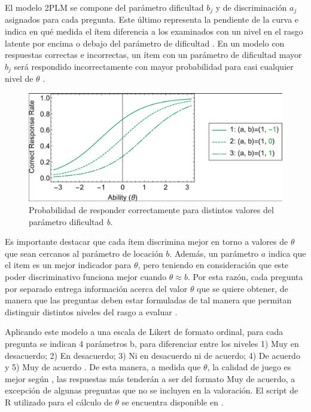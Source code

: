 El modelo 2PLM se compone del parámetro dificultad $b_j$ y de discriminación $a_j$ asignados para cada pregunta. Este último representa la pendiente de la curva e indica en qué medida el ítem diferencia a los examinados con un nivel en el rasgo latente por encima o debajo del parámetro de dificultad \cite{TeoriaRespuestaAlItemPsicologia}. En un modelo con respuestas correctas e incorrectas, un ítem con un parámetro de dificultad mayor $b_j$ será respondido incorrectamente con mayor probabilidad para casi cualquier nivel de $\theta$ \cite{IRTShojima2022}.


\begin{figure}[h]
	\centering
	\includegraphics[scale=.5]{imagenes/IRTparambdifficulty.png}
	\caption{Probabilidad de responder correctamente para distintos valores del parámetro dificultad \textit{b}.}
	\label{ParamDifficulty}
\end{figure}


Es importante destacar que cada ítem discrimina mejor en torno a valores de $\theta$ que sean cercanos al parámetro de locación $b$. Además, un parámetro $a$ indica que el item es un mejor indicador para $\theta$, pero teniendo en consideración que este poder discriminativo funciona mejor cuando $\theta \approx b$. Por esta razón, cada pregunta por separado entrega información acerca del valor $\theta$ que se quiere obtener, de manera que las preguntas deben estar formuladas de tal manera que permitan distinguir distintos niveles del rasgo a evaluar \cite{TeoriaRespuestaAlItemPsicologia}.

Aplicando este modelo a una escala de Likert de formato ordinal, para cada pregunta se indican 4 parámetros b, para diferenciar entre los niveles 1) Muy en desacuerdo; 2) En desacuerdo; 3) Ni en desacuerdo ni de acuerdo; 4) De acuerdo y 5) Muy de acuerdo \cite{TeoriaRespuestaAlItemPsicologia, meegaplusQualityEvaluationPage}. De esta manera, a medida que $\theta$, la calidad de juego es mejor según \cite{meegaplusQualityEvaluationPage}, las respuestas más tenderán a ser del formato Muy de acuerdo, a excepción de algunas preguntas que no se incluyen en la valoración. El script de R utilizado para el cálculo de $\theta$ se encuentra disponible en \cite{meegaplusQualityEvaluationPage}.

